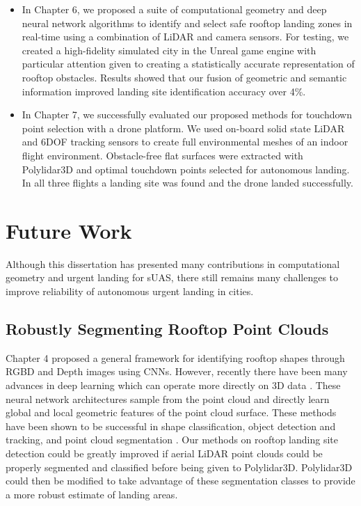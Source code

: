 \begin{itemize}
    \item In Chapter 6, we proposed a suite of computational geometry and deep neural network algorithms to identify and select safe rooftop landing zones in real-time using a combination of LiDAR and camera sensors. For testing, we created a high-fidelity simulated city in the Unreal game engine with particular attention given to creating a statistically accurate representation of rooftop obstacles. Results showed that our fusion of geometric and semantic information improved landing site identification accuracy over 4\%.
    \item In Chapter 7, we successfully evaluated our proposed methods for touchdown point selection with a drone platform. We used on-board solid state LiDAR and 6DOF tracking sensors to create full environmental meshes of an indoor flight environment. Obstacle-free flat surfaces were extracted with Polylidar3D and optimal touchdown points selected for autonomous landing. In all three flights a landing site was found and the drone landed successfully.
\end{itemize}
\section{Future Work}

Although this dissertation has presented many contributions in computational geometry and urgent landing for \ac{sUAS}, there still remains many challenges to improve reliability of autonomous urgent landing in cities.

\subsection{Robustly Segmenting Rooftop Point Clouds}

Chapter 4 proposed a general framework for identifying rooftop shapes through RGBD and Depth images using CNNs. However, recently there have been many advances in deep learning which can operate more directly on 3D data \cite{qi_pointnet_2017-1, xu_spidercnn_2018, liu_dynamic_2019}. These neural network architectures sample from the point cloud and directly learn global and local geometric features of the point cloud surface. These methods have been shown to be successful in shape classification, object detection and tracking, and point cloud segmentation \cite{guo_deep_2020}. Our methods on rooftop landing site detection could be greatly improved if aerial LiDAR point clouds could be properly segmented and classified before being given to Polylidar3D. Polylidar3D could then be modified to take advantage of these segmentation classes to provide a more robust estimate of landing areas.

